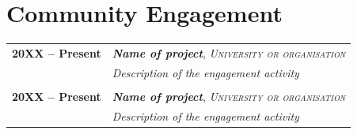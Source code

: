 \section{Community Engagement}
\begin{longtable}{@{}p{2.5cm}>{\raggedright\arraybackslash}p{16cm}@{}}
\textbf{20XX -- Present} & \textbf{\textit{Name of project}}, \textsc{\textit{University or organisation}} \\
& \textit{Description of the engagement activity} \\
& \\
\textbf{20XX -- Present} & \textbf{\textit{Name of project}}, \textsc{\textit{University or organisation}} \\
& \textit{Description of the engagement activity} \\
\end{longtable}
